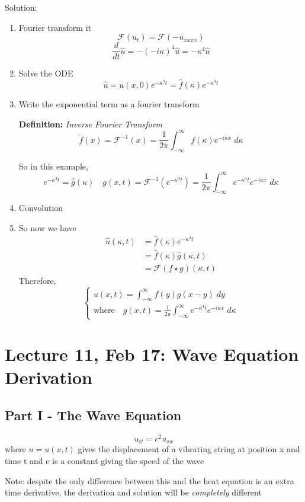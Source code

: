 \documentclass[12pt]{article}
\renewcommand{\hat}[1]{\widehat{#1}}
\newcommand{\F}{\mathcal{F}}
\begin{document}
Solution:
\begin{enumerate}
    \item Fourier transform it
    \[\F\left(u_t\right) = \F\left(-u_{xxxx}\right)\]
    \[\frac{d}{dt} \hat{u} = -(-i\kappa)^4 \hat{u} = -\kappa^4 \hat{u}\]
    \item Solve the ODE 
    \[\hat{u} = u(x, 0)e^{-\kappa^4t} = \hat{f}(\kappa) e^{-\kappa^4t} \]
    \item Write the exponential term as a fourier transform 
    
    \textbf{Definition:} \emph{Inverse Fourier Transform}
    \[\boxed{\check{f}(x) = \mathcal{F}^{-1}(x) = \frac{1}{2\pi} \int_{-\infty}^\infty f(\kappa) e^{-i\kappa x}\; d\kappa}\]

    So in this example, 
    \[e^{-\kappa^4t} = \hat{g}(\kappa) \quad g(x, t) = \mathcal{F}^{-1}\left(e^{-\kappa^4 t}\right) = \frac{1}{2\pi} \int_{-\infty}^\infty e^{-\kappa^4 t} e^{-i\kappa x}\; d\kappa\]

    \item Convolution 
    \item 
    So now we have 
    \begin{align*}
        \hat{u}(\kappa, t) &= \hat{f}(\kappa)e^{-\kappa^4 t}\\
        &= \hat{f}(\kappa) \hat{g}(\kappa, t)\\
        &= \F\left(f \star g\right)(\kappa, t)
    \end{align*}
    Therefore, 
    \[\boxed{\begin{cases}
        u(x, t) = \int_{-\infty}^\infty f(y) g(x - y)\; dy\\
        \text{where} \quad g(x, t) = \frac{1}{2\pi} \int_{-\infty}^\infty e^{-\kappa^4 t} e^{-i\kappa x}\; d\kappa
    \end{cases}}\]
\end{enumerate}

\section*{Lecture 11, Feb 17: Wave Equation Derivation}
\subsection*{Part I - The Wave Equation}
\[u_{tt} = c^2 u_{xx}\]
where $u = u(x, t)$ gives the displacement of a vibrating string at position x and time t and c is a constant giving the speed of the wave  

Note: despite the only difference between this and the heat equation is an extra time derivative, the derivation and solution will be \emph{completely} different
\end{document}

